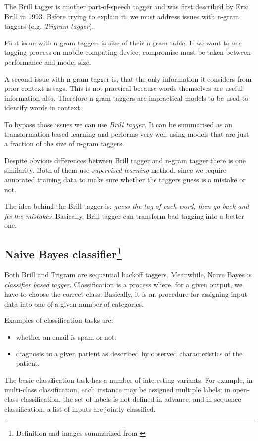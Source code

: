 \documentclass[10pt, conference, compsocconf]{IEEEtran}
\begin{document}
The Brill tagger is another part-of-speech tagger and was first described by Eric Brill in 1993. Before trying to explain it, we must address issues with n-gram taggers (e.g. \textit{Trigram tagger}).

First issue with n-gram taggers is size of their n-gram table. If we want to use tagging process on mobile computing device, compromise must be taken between performance and model size. 

A second issue with n-gram tagger is, that the only information it considers from prior context is tags. This is not practical because words themselves are useful information also. Therefore n-gram taggers are impractical models to be used to identify words in context. 
  
To bypass those issues we can use \textit{Brill tagger}. It can be summarised as an transformation-based learning and performs very well using models that are just a fraction of the size of n-gram taggers.

Despite obvious differences between Brill tagger and n-gram tagger there is one similarity. Both of them use \textit{supervised learning} method, since we require annotated training data to make sure whether the taggers guess is a mistake or not.

The idea behind the Brill tagger is: \textit{guess the tag of each word, then go back and fix the mistakes}. Basically, Brill tagger can transform bad tagging into a better one. 

\subsection[Naive Bayes classifier]{Naive Bayes classifier\footnote{Definition and images summarized from \cite{NLTKBOOK}}}
Both Brill and Trigram are sequential backoff taggers. Meanwhile, Naive Bayes is \textit{classifier based tagger}.
Classification is a process where, for a given output, we have to choose the correct class. Basically, it is an  procedure for assigning input data into one of a given number of categories.

Examples of classification tasks are:
\begin{itemize}
\item whether an email is spam or not.
\item diagnosis to a given patient as described by observed characteristics of the patient.
\end{itemize}
The basic classification task has a number of interesting variants. For example, in multi-class classification, each instance may be assigned multiple labels; in open-class classification, the set of labels is not defined in advance; and in sequence classification, a list of inputs are jointly classified.
\end{document}
